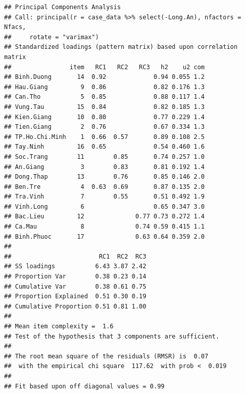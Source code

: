 \documentclass[../thesis.tex]{subfiles}
\begin{document}
\begin{verbatim}
## Principal Components Analysis
## Call: principal(r = case_data %>% select(-Long.An), nfactors = Nfacs, 
##     rotate = "varimax")
## Standardized loadings (pattern matrix) based upon correlation matrix
##                item   RC1   RC2   RC3   h2    u2 com
## Binh.Duong       14  0.92             0.94 0.055 1.2
## Hau.Giang         9  0.86             0.82 0.176 1.3
## Can.Tho           5  0.85             0.88 0.117 1.4
## Vung.Tau         15  0.84             0.82 0.185 1.3
## Kien.Giang       10  0.80             0.77 0.229 1.4
## Tien.Giang        2  0.76             0.67 0.334 1.3
## TP.Ho.Chi.Minh    1  0.66  0.57       0.89 0.108 2.5
## Tay.Ninh         16  0.65             0.54 0.460 1.6
## Soc.Trang        11        0.85       0.74 0.257 1.0
## An.Giang          3        0.83       0.81 0.192 1.4
## Dong.Thap        13        0.76       0.85 0.146 2.0
## Ben.Tre           4  0.63  0.69       0.87 0.135 2.0
## Tra.Vinh          7        0.55       0.51 0.492 1.9
## Vinh.Long         6                   0.65 0.347 3.0
## Bac.Lieu         12              0.77 0.73 0.272 1.4
## Ca.Mau            8              0.74 0.59 0.415 1.1
## Binh.Phuoc       17              0.63 0.64 0.359 2.0
## 
##                        RC1  RC2  RC3
## SS loadings           6.43 3.87 2.42
## Proportion Var        0.38 0.23 0.14
## Cumulative Var        0.38 0.61 0.75
## Proportion Explained  0.51 0.30 0.19
## Cumulative Proportion 0.51 0.81 1.00
## 
## Mean item complexity =  1.6
## Test of the hypothesis that 3 components are sufficient.
## 
## The root mean square of the residuals (RMSR) is  0.07 
##  with the empirical chi square  117.62  with prob <  0.019 
## 
## Fit based upon off diagonal values = 0.99
\end{verbatim}

\begin{Shaded}
	\begin{Highlighting}[]
		 \NormalTok{, }
		 \NormalTok{) }\SpecialCharTok{\%\textgreater{}\%} 
		 \NormalTok{, }
		 \NormalTok{)}
	\end{Highlighting}
\end{Shaded}
\end{document}

